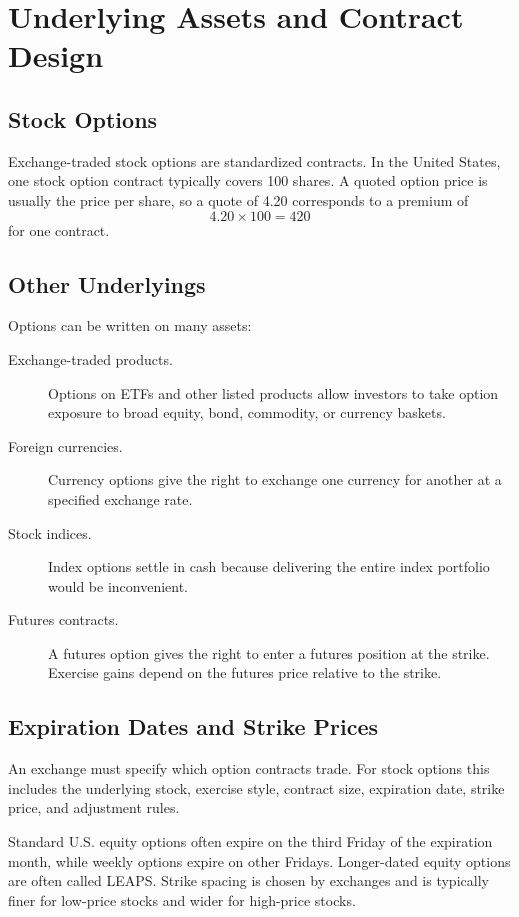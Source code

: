 \section{Underlying Assets and Contract Design}

\subsection{Stock Options}

Exchange-traded stock options are standardized contracts. In the United States,
one stock option contract typically covers 100 shares. A quoted option price is
usually the price per share, so a quote of 4.20 corresponds to a premium of
\[
    4.20 \times 100 = 420
\]
for one contract.

\subsection{Other Underlyings}

Options can be written on many assets:
\begin{description}
    \item[Exchange-traded products.] Options on ETFs and other listed products
    allow investors to take option exposure to broad equity, bond, commodity, or
    currency baskets.
    \item[Foreign currencies.] Currency options give the right to exchange one
    currency for another at a specified exchange rate.
    \item[Stock indices.] Index options settle in cash because delivering the
    entire index portfolio would be inconvenient.
    \item[Futures contracts.] A futures option gives the right to enter a
    futures position at the strike. Exercise gains depend on the futures price
    relative to the strike.
\end{description}

\subsection{Expiration Dates and Strike Prices}

An exchange must specify which option contracts trade. For stock options this
includes the underlying stock, exercise style, contract size, expiration date,
strike price, and adjustment rules.

Standard U.S. equity options often expire on the third Friday of the expiration
month, while weekly options expire on other Fridays. Longer-dated equity options
are often called LEAPS. Strike spacing is chosen by exchanges and is typically
finer for low-price stocks and wider for high-price stocks.

